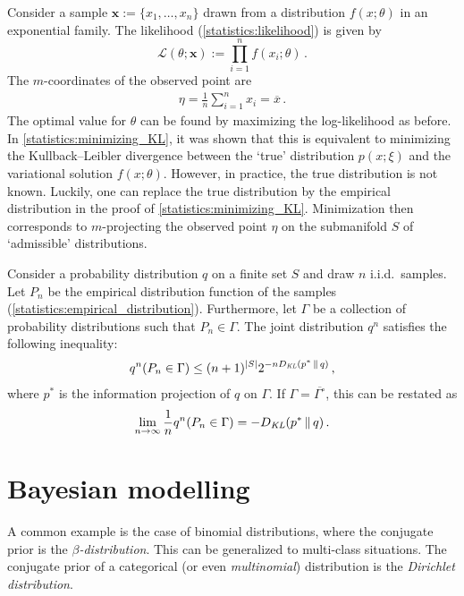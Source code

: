     Consider a sample $\symbf{x}:=\{x_1,\ldots,x_n\}$ drawn from a distribution $f(x;\theta)$ in an exponential family. The likelihood (\cref{statistics:likelihood}) is given by \[\mathcal{L}(\theta;\symbf{x}) := \prod_{i=1}^nf(x_i;\theta)\,.\] The $m$-coordinates of the observed point are
    \begin{gather}
        \eta = \frac{1}{n}\sum_{i=1}^nx_i = \overline{x}\,.
    \end{gather}
    The optimal value for $\theta$ can be found by maximizing the log-likelihood as before. In \cref{statistics:minimizing_KL}, it was shown that this is equivalent to minimizing the Kullback--Leibler divergence between the `true' distribution $p(x;\xi)$ and the variational solution $f(x;\theta)$. However, in practice, the true distribution is not known. Luckily, one can replace the true distribution by the empirical distribution in the proof of \cref{statistics:minimizing_KL}. Minimization then corresponds to $m$-projecting the observed point $\eta$ on the submanifold $S$ of `admissible' distributions.

    \begin{theorem}[Sanov]
        Consider a probability distribution $q$ on a finite set $S$ and draw $n$ i.i.d.~samples. Let $P_n$ be the empirical distribution function of the samples (\cref{statistics:empirical_distribution}). Furthermore, let $\Gamma$ be a collection of probability distributions such that $P_n\in\Gamma$. The joint distribution $q^n$ satisfies the following inequality:
        \begin{gather}
            q^n(P_n\in\Gamma) \leq (n+1)^{|S|}2^{-n D_{\emph{KL}}(p^*\,\|\,q)}\,,
        \end{gather}
        where $p^*$ is the information projection of $q$ on $\Gamma$. If $\Gamma=\overline{\Gamma^\circ}$, this can be restated as
        \begin{gather}
            \lim_{n\rightarrow\infty}\frac{1}{n}q^n(P_n\in\Gamma) = - D_{\emph{KL}}(p^*\,\|\,q)\,.
        \end{gather}
    \end{theorem}

\section{Bayesian modelling}

    \begin{example}
        A common example is the case of binomial distributions, where the conjugate prior is the \textit{$\beta$-distribution}. This can be generalized to multi-class situations. The conjugate prior of a categorical (or even \textit{multinomial}) distribution is the \textit{Dirichlet distribution}.
    \end{example}

